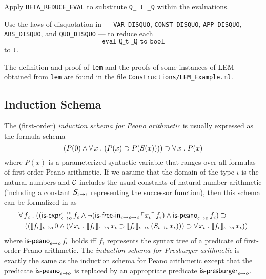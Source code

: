 \documentclass[fleqn]{llncs}
\begin{document}
  \item Apply \texttt{BETA\_REDUCE\_EVAL} to substitute \texttt{Q\_ t
    \_Q} within the evaluations.

  \item Use the laws of disquotation in {\HLQE} ---
    \texttt{VAR\_DISQUO}, \texttt{CONST\_DISQUO},
    \texttt{APP\_DISQUO}, \texttt{ABS\_DISQUO}, and
    \texttt{QUO\_DISQUO} --- to reduce each \[\texttt{eval Q\_ t \_Q to
      bool}\] to \texttt{t}.

\ee

The definition and proof of \texttt{lem} and the proofs of some
instances of LEM obtained from \texttt{lem} are found in the file
\texttt{Constructions/LEM\_Example.ml}.

\subsection{Induction Schema}

The (first-order) \emph{induction schema for Peano arithmetic} is
usually expressed as the formula schema
\[(P(0) \wedge \forall\, x \mathrel. (P(x) \supset P(S(x)))) \supset 
\forall\, x \mathrel. P(x)\] where $P(x)$ is a parameterized syntactic
variable that ranges over all formulas of first-order Peano
arithmetic.  If we assume that the domain of the type $\iota$ is the
natural numbers and $\mbox{$\cal C$}$ includes the usual constants of natural
number arithmetic (including a constant $S_{\iota \rightarrow
  \iota}$ representing the successor function), then this schema can
be formalized in {\churchqe} as
\begin{align*}
&
\forall\, f_\epsilon \mathrel. 
((\mbox{\sf is-expr}_{\epsilon \rightarrow o}^{\iota \rightarrow o} \, f_\epsilon \wedge
\neg (\mbox{\sf is-free-in}_{\epsilon \rightarrow \epsilon \rightarrow o} \, 
\ulcorner x_\iota\urcorner \, f_\epsilon) \wedge
\mbox{\sf is-peano}_{\epsilon \rightarrow o} \, f_\epsilon) \supset {} \\
&
\hspace*{2ex}
((\llbracket f_\epsilon\rrbracket_{\iota \rightarrow o} \, 0 \wedge
(\forall\, x_\iota \mathrel. \llbracket f_\epsilon\rrbracket_{\iota \rightarrow o} \, x_\iota \supset
\llbracket f_\epsilon\rrbracket_{\iota \rightarrow o} \, 
(S_{\iota \rightarrow \iota} \, x_\iota)))
\supset 
\forall\, x_\iota \mathrel. \llbracket f_\epsilon\rrbracket_{\iota \rightarrow o} \, x_\iota))
\end{align*}
where $\mbox{\sf is-peano}_{\epsilon \rightarrow o} \, f_\epsilon$ holds iff
$f_\epsilon$ represents the syntax tree of a predicate of
first-order Peano arithmetic.  The \emph{induction schema for
  Presburger arithmetic} is exactly the same as the induction schema
for Peano arithmetic except that the predicate
$\mbox{\sf is-peano}_{\epsilon \rightarrow o}$ is replaced by an appropriate
predicate $\mbox{\sf is-presburger}_{\epsilon \rightarrow o}$.
\end{document}
